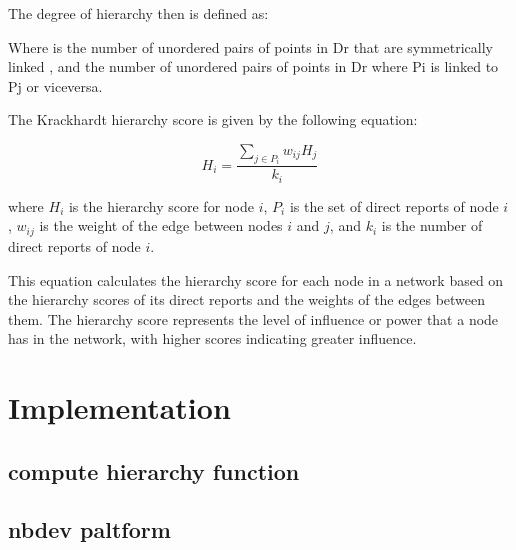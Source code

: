 The degree of hierarchy then is defined as:

Where is the number of unordered pairs of points in Dr that are symmetrically linked , and the number of unordered pairs of points in Dr where Pi is linked to Pj or viceversa.


The Krackhardt hierarchy score is given by the following equation:

\begin{equation}
H_i = \frac{\sum_{j \in P_i} w_{ij} H_j}{k_i}
\end{equation}

where $H_i$ is the hierarchy score for node $i$, $P_i$ is the set of direct reports of node $i$, $w_{ij}$ is the weight of the edge between nodes $i$ and $j$, and $k_i$ is the number of direct reports of node $i$.

This equation calculates the hierarchy score for each node in a network based on the hierarchy scores of its direct reports and the weights of the edges between them. The hierarchy score represents the level of influence or power that a node has in the network, with higher scores indicating greater influence.





\section{Implementation}

\subsection{compute hierarchy function}

\subsection{nbdev paltform}




